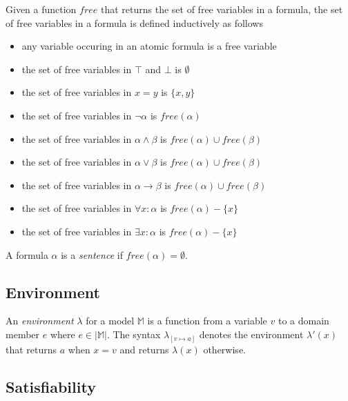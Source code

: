 		Given a function $free$ that returns the set of free variables in a
		formula, the set of free variables in a formula is defined inductively
		as follows
		\begin{itemize}
		\item any variable occuring in an atomic formula is a free variable
		\item the set of free variables in $\top$ and $\bot$ is $\emptyset$
		\item the set of free variables in $x = y$ is $\{x,y\}$
		\item the set of free variables in $\neg\alpha$ is $free(\alpha)$
		\item the set of free variables in $\alpha \wedge \beta$ is $free(\alpha) \cup free(\beta)$
		\item the set of free variables in $\alpha \vee   \beta$ is $free(\alpha) \cup free(\beta)$
		\item the set of free variables in $\alpha \to    \beta$ is $free(\alpha) \cup free(\beta)$
		\item the set of free variables in $\forall x : \alpha$ is $free(\alpha) - \{x\}$
		\item the set of free variables in $\exists x : \alpha$ is $free(\alpha) - \{x\}$
		\end{itemize}
		A formula $\alpha$ is a \emph{sentence} if $free(\alpha) = \emptyset$.

	\subsection{Environment}

		An \emph{environment} $\lambda$ for a model $\mathbb{M}$ is a function
		from a variable $v$ to a domain member $e$ where $e \in |\mathbb{M}|$.
		The syntax $\lambda_{[v \mapsto a]}$ denotes the environment
		$\lambda'(x)$ that returns $a$ when $x=v$ and returns $\lambda(x)$
		otherwise.

	\subsection{Satisfiability}

